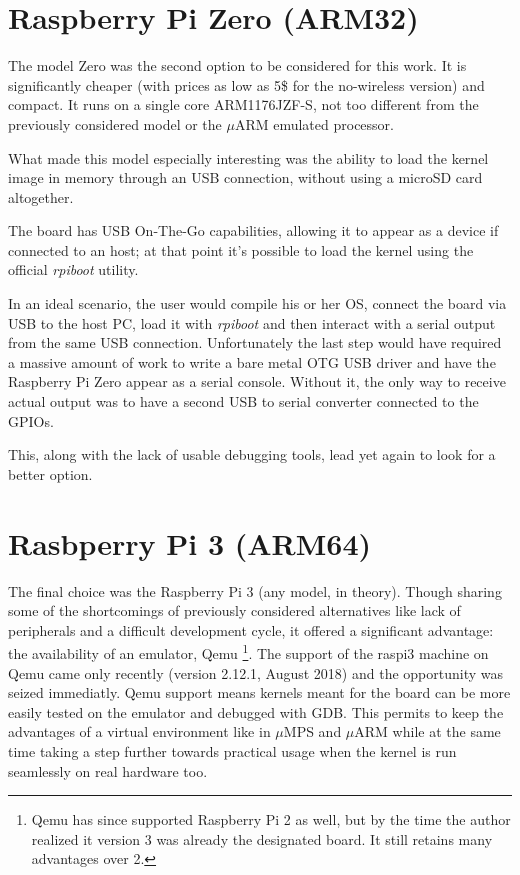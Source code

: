 \documentclass[12pt,a4paper,openright,twoside]{report}
\begin{document}
\section{Raspberry Pi Zero (ARM32)}
The model Zero was the second option to be considered for this work. It is 
significantly cheaper (with prices as low as 5\$ for the no-wireless version)
and compact. It runs on a single core ARM1176JZF-S, not too different from
the previously considered model or the $\mu$ARM emulated processor.

What made this model especially interesting was the ability to load the kernel
image in memory through an USB connection, without using a microSD card altogether.

The board has USB On-The-Go capabilities, allowing it to appear as a device if connected
to an host; at that point it's possible to load the kernel using the official
 \textit{rpiboot} utility.

In an ideal scenario, the user would compile his or her OS, connect the board
via USB to the host PC, load it with \textit{rpiboot} and then interact with a
serial output from the same USB connection.
Unfortunately the last step would have required a massive amount of work to write
a bare metal OTG USB driver and have the Raspberry Pi Zero appear as a serial 
console. Without it, the only way to receive actual output was to have a second
USB to serial converter connected to the GPIOs.

This, along with the lack of usable debugging tools, lead yet again to look for
a better option.

\section{Rasbperry Pi 3 (ARM64)}
The final choice was the Raspberry Pi 3 (any model, in theory). Though sharing
some of the shortcomings of previously considered alternatives like lack of 
peripherals and a difficult development cycle, it offered a significant advantage:
the availability of an emulator, Qemu \footnote{Qemu has since supported Raspberry Pi 2
as well, but by the time the author realized it version 3 was already the designated
board. It still retains many advantages over 2.}.
The support of the raspi3 machine on Qemu came only recently (version 2.12.1, August 2018)
and the opportunity was seized immediatly. Qemu support means kernels meant for
the board can be more easily tested on the emulator and debugged with GDB.
This permits to keep the advantages of a virtual environment like in $\mu$MPS and
$\mu$ARM while at the same time taking a step further towards practical usage
when the kernel is run seamlessly on real hardware too.
\end{document}
